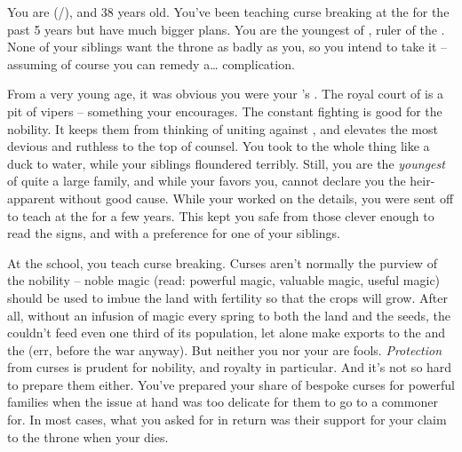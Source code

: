 \documentclass[char]{GL2020}
\begin{document}
\name{\cPrince{}}

You are \cPrince{\full} (\cPrince{\they}/\cPrince{\them}), and 38 years old. You've been teaching curse breaking at the \pSchool{} for the past 5 years but have much bigger plans. You are the youngest \cPrince{\child} of \cQueen{\full}, ruler of the \pFarm{}. None of your siblings want the throne as badly as you, so you intend to take it -- assuming of course you can remedy a\ldots{} complication.

From a very young age, it was obvious you were your \cQueen{\parent}'s \cPrince{\child}. The royal court of \pFarm{} is a pit of vipers -- something your \cQueen{\parent} encourages. The constant fighting is good for the nobility. It keeps them from thinking of uniting against \cQueen{\them}, and elevates the most devious and ruthless to the top of \cQueen{\their} counsel. You took to the whole thing like a duck to water, while your siblings floundered terribly.  Still, you are the \emph{youngest} of quite a large family, and while your \cQueen{\parent} favors you, \cQueen{\they} cannot declare you the heir-apparent without good cause. While your \cQueen{\parent} worked on the details, you were sent off to teach at the \pSchool{} for a few years. This kept you safe from those clever enough to read the signs, and with a preference for one of your siblings. 

At the school, you teach curse breaking. Curses aren't normally the purview of the nobility -- noble magic (read: powerful magic, valuable magic, useful magic) should be used to imbue the land with fertility so that the crops will grow. After all, without an infusion of magic every spring to both the land and the seeds, the \pFarm{} couldn't feed even one third of its population, let alone make exports to the \pTech{} and the \pShip{} (err, before the war anyway). But neither you nor your \cQueen{\parent} are fools. \emph{Protection} from curses is prudent for nobility, and royalty in particular. And it's not so hard to prepare them either. You've prepared your share of bespoke curses for powerful families when the issue at hand was too delicate for them to go to a commoner for. In most cases, what you asked for in return was their support for your claim to the throne when your \cQueen{\parent} dies. 
\end{document}
